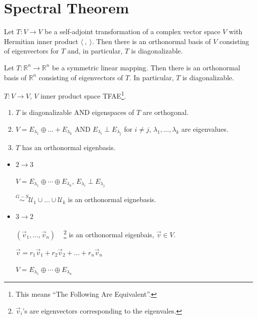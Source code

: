 \documentclass[11pt,fleqn]{book} %
\begin{document}
\section{Spectral Theorem}

\setcounter{chapter}{5}
\setcounter{section}{3}
\setcounter{dummy}{11}
\begin{theorem}
    Let $T: V \to V$ be a self-adjoint transformation of a complex vector space $V$ with Hermitian inner product $\langle ~,~ \rangle$. Then there is an orthonormal basis of $V$ consisting of eigenvectors for $T$ and, in particular, $T$ is diagonalizable.
\end{theorem}

\setcounter{chapter}{4}
\setcounter{section}{6}
\setcounter{dummy}{0}
\begin{theorem}
    Let $T: \mathbb{R}^n \to \mathbb{R}^n$ be a symmetric linear mapping. Then there is an orthonormal basis of $\mathbb{R}^n$ consisting of eigenvectors of $T$. In particular, $T$ is diagonalizable.
\end{theorem}
\setcounter{chapter}{3}

$T: V \to V$, $V$ inner product space TFAE\footnote{This means ``The Following Are Equivalent''. }.

\begin{enumerate}
    \item $T$ is diagonalizable AND eigenspaces of $T$ are orthogonal.
    \item $V = E_{\lambda_1} \oplus \dots + E_{\lambda_k}$ AND $E_{\lambda_i} \perp E_{\lambda_j}$ for $i \neq j$, $\lambda_1, \dots, \lambda_k$ are eigenvalues.
    \item $T$ has an orthonormal eigenbasis.
\end{enumerate}

\begin{itemize}
    \item $2 \to 3$

    $V = E_{\lambda_1} \oplus \cdots \oplus E_{\lambda_k}$, $E_{\lambda_i} \perp E_{\lambda_j}$

    $\overset{G-S}{\sim} \mathcal{U}_1 \cup \dots \cup \mathcal{U}_k$ is an orthonormal eignebasis.

    \item $3 \to 2$

    $(\vec{v}_1, \dots, \vec{v}_n)$ ~ \footnote{$\vec{v}_i$'s are eigenvectors corresponding to the eigenvales. } is an orthonormal eigenbais, $\vec{v} \in V$.

    $\vec{v} = r_1\vec{v}_1 + r_2\vec{v}_2 + \dots + r_n\vec{v}_n$

    $V = E_{\lambda_1} \oplus \cdots \oplus E_{\lambda_n}$
\end{itemize}
\end{document}
